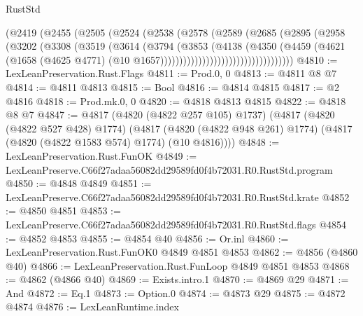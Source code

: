 \begin{lexlean}{RustStd}
\begin{coremodule}
                              (@2419
                                (@2455
                                  (@2505
                                    (@2524
                                      (@2538
                                        (@2578
                                          (@2589
                                            (@2685
                                              (@2895
                                                (@2958
                                                  (@3202
                                                    (@3308
                                                      (@3519
                                                        (@3614
                                                          (@3794
                                                            (@3853
                                                              (@4138
                                                                (@4350
                                                                  (@4459
                                                                    (@4621
                                                                      (@1658
                                                                        (@4625 @4771)
                                                                        (@10
                                                                          @1657)))))))))))))))))))))))))))))))))))
@4810 := LexLeanPreservation.Rust.Flags
@4811 := Prod.{0, 0}
@4813 := @4811 @8 @7
@4814 := @4811 @4813
@4815 := Bool
@4816 := @4814 @4815
@4817 := @2 @4816
@4818 := Prod.mk.{0, 0}
@4820 := @4818 @4813 @4815
@4822 := @4818 @8 @7
@4847 := @4817
    (@4820 (@4822 @257 @105) @1737)
    (@4817
      (@4820 (@4822 @527 @428) @1774)
      (@4817 (@4820 (@4822 @948 @261) @1774) (@4817 (@4820 (@4822 @1583 @574) @1774) (@10 @4816))))
@4848 := LexLeanPreservation.Rust.FunOK
@4849 := LexLeanPreserve.C66f27adaa56082dd29589fd0f4b72031.R0.RustStd.program
@4850 := @4848 @4849
@4851 := LexLeanPreserve.C66f27adaa56082dd29589fd0f4b72031.R0.RustStd.krate
@4852 := @4850 @4851
@4853 := LexLeanPreserve.C66f27adaa56082dd29589fd0f4b72031.R0.RustStd.flags
@4854 := @4852 @4853
@4855 := @4854 @40
@4856 := Or.inl
@4860 := LexLeanPreservation.Rust.FunOK0 @4849 @4851 @4853
@4862 := @4856 (@4860 @40)
@4866 := LexLeanPreservation.Rust.FunLoop @4849 @4851 @4853
@4868 := @4862 (@4866 @40)
@4869 := Exists.intro.{1}
@4870 := @4869 @29
@4871 := And
@4872 := Eq.{1}
@4873 := Option.{0}
@4874 := @4873 @29
@4875 := @4872 @4874
@4876 := LexLeanRuntime.index

\end{coremodule}
\end{lexlean}

